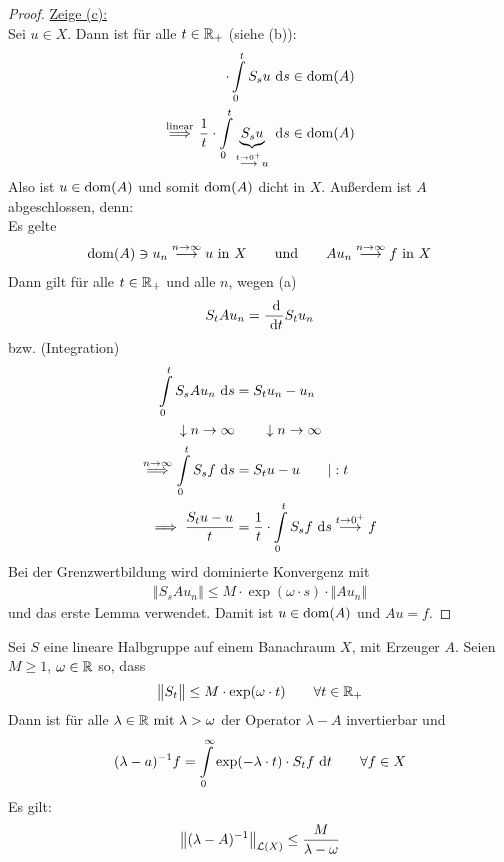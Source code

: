\begin{proof}
\underline{Zeige (c):}\\
Sei $u\in X$. Dann ist für alle $t\in\mathbb{R}_+$ (siehe (b)):
\begin{align*}
\cdot\int\limits_0^t S_s u \text{ d} s\in\operatorname{dom}(A)\\
\overset{\text{linear}}{\implies}
\frac{1}{t}\cdot\int\limits_0^t \underbrace{S_s u}_{\stackrel{t\to 0^+}{\longrightarrow} u} \text{ d} s\in\operatorname{dom}(A)\\
\end{align*}
Also ist $u\in\operatorname{dom}(A)$ und somit $\operatorname{dom}(A)$ dicht in $X$. Außerdem ist $A$ abgeschlossen, denn:\\
Es gelte
\begin{align*}
\operatorname{dom}(A)\ni u_n\stackrel{n\to\infty}{\longrightarrow} u\text{ in }X
\qquad\text{und}\qquad
A u_n\stackrel{n\to\infty}{\longrightarrow} f\text{ in }X
\end{align*}
Dann gilt für alle $t\in\mathbb{R}_+$ und alle $n$, wegen (a)
\begin{align*}
S_t A u_n=\frac{\text{ d}}{\text{ d} t}S_t u_n
\end{align*}
bzw. (Integration)
\begin{align*}
\int\limits_0^t S_s A u_n\text{ d} s&=S_t u_n-u_n\\
\downarrow n\to\infty&\qquad\downarrow n\to\infty\\
\overset{n\to\infty}{\implies}
\int\limits_0^t S_s f\text{ d} s&=S_t u-u\qquad|:t\\
\implies
\frac{S_t u-u}{t}&=\frac{1}{t}\cdot\int\limits_0^t S_s f\text{ d} s\stackrel{t\to0^+}{\longrightarrow} f
\end{align*}
Bei der Grenzwertbildung wird dominierte Konvergenz mit
\begin{align*}
\left\Vert S_s A u_n\right\Vert\leq M\cdot\exp(\omega\cdot s)\cdot\big\Vert A u_n\big\Vert
\end{align*}
und das erste Lemma verwendet.
Damit ist $u\in\operatorname{dom}(A)$ und $Au=f$.
\end{proof}

\begin{lemma}
Sei $S$ eine lineare Halbgruppe auf einem Banachraum $X$, mit Erzeuger $A$. Seien $M\geq1$, $\omega\in\mathbb{R}$ so, dass 
\begin{align*}
\big\Vert S_t\big\Vert\leq M\cdot\exp(\omega\cdot t)\qquad\forall t\in\mathbb{R}_+
\end{align*}
Dann ist für alle $\lambda\in\mathbb{R}\text{ mit }\lambda>\omega$ der Operator $\lambda-A$ invertierbar und 
\begin{align*}
(\lambda-a)^{-1}f=\int\limits_0^\infty\exp(-\lambda\cdot t)\cdot S_t f\text{ d} t\qquad\forall f\in X
\end{align*}
Es gilt:
\begin{align*}
\left\Vert(\lambda-A)^{-1}\right\Vert_{\mathcal{L}(X)}\leq\frac{M}{\lambda-\omega}
\end{align*}
\end{lemma}

